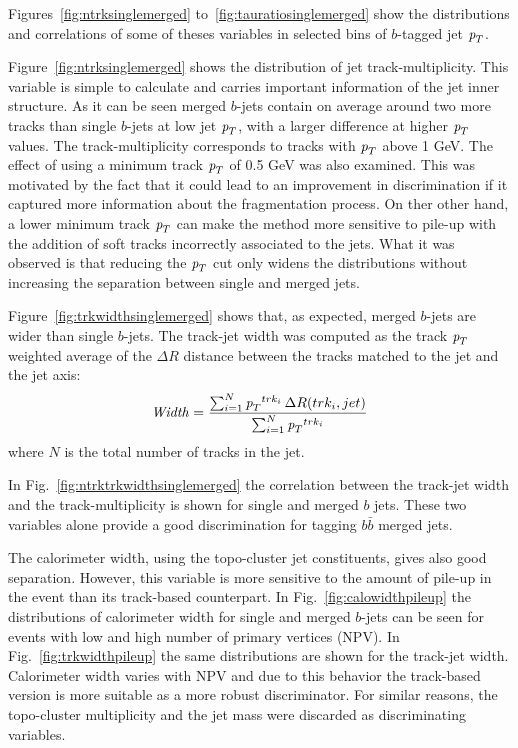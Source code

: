 Figures~\ref{fig:ntrksinglemerged} to~\ref{fig:tauratiosinglemerged} show the distributions and correlations of some of theses variables in selected bins of $b$-tagged jet ${\emph{p}_{T}}$.

Figure~\ref{fig:ntrksinglemerged} shows the distribution of jet track-multiplicity. This variable is simple to calculate and carries important information of the jet inner structure. As it can be seen merged $b$-jets contain on average around two more tracks than single $b$-jets at low jet ${\emph{p}_{T}}$, with a larger difference at higher ${\emph{p}_{T}}$ values. The track-multiplicity corresponds to tracks with ${\emph{p}_{T}}$ above 1 GeV. The effect of using a minimum track ${\emph{p}_{T}}$ of 0.5 GeV was also examined. This was motivated by the fact that it could lead to an improvement in discrimination if it captured more information about the fragmentation process.  On ther other hand, a lower minimum track ${\emph{p}_{T}}$ can make the method more sensitive to pile-up with the addition of soft tracks incorrectly associated to the jets.  What it was observed is that reducing the ${\emph{p}_{T}}$ cut only widens the distributions without increasing the separation between single and merged jets. 

Figure~\ref{fig:trkwidthsinglemerged} shows that, as expected, merged $b$-jets are wider than single $b$-jets. The track-jet width was computed as the track ${\emph{p}_{T}}$ weighted average of the $\Delta R$ distance between the tracks matched to the jet and the jet axis:
\begin{equation*} 
{\it Width} = \frac{\sum_{i=1}^N {\emph{p}_{T}}^{trk_i} \,\Delta R (trk_i,jet) }{\sum_{i=1}^N {\emph{p}_{T}}^{trk_i} }
\end{equation*} 
where $N$ is the total number of tracks in the jet.


In Fig.~\ref{fig:ntrktrkwidthsinglemerged} the correlation between the track-jet width and the track-multiplicity is shown for single and merged $b$ jets. These two variables alone provide a good discrimination for tagging $b \bar{b}$ merged jets.


The calorimeter width, using the topo-cluster jet constituents, gives also good separation. However, this variable is more sensitive to the amount of pile-up in the event than its track-based counterpart. In Fig.~\ref{fig:calowidthpileup} the distributions of calorimeter width for single and merged $b$-jets can be seen for events with low and high number of primary vertices (NPV). In Fig.~\ref{fig:trkwidthpileup} the same distributions are shown for the track-jet width. Calorimeter width varies %
with NPV and due to this behavior the track-based version is more suitable as a more robust discriminator. For similar reasons, the topo-cluster multiplicity and the jet mass were discarded as discriminating variables.


